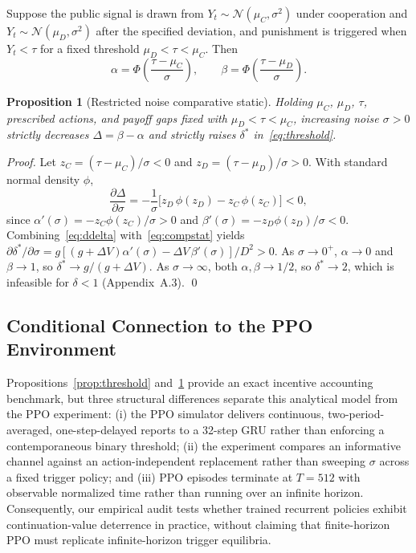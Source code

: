 \documentclass{article}
\newtheorem{proposition}{Proposition}
\begin{document}
Suppose the public signal is drawn from $Y_t\sim\mathcal{N}(\mu_C,\sigma^2)$ under cooperation and $Y_t\sim\mathcal{N}(\mu_D,\sigma^2)$ after the specified deviation, and punishment is triggered when $Y_t<\tau$ for a fixed threshold $\mu_D<\tau<\mu_C$. Then
\[
\alpha = \Phi\!\left(\frac{\tau-\mu_C}{\sigma}\right),\qquad
\beta  = \Phi\!\left(\frac{\tau-\mu_D}{\sigma}\right).
\]

\begin{proposition}[Restricted noise comparative static]\label{prop:gauss}
Holding $\mu_C$, $\mu_D$, $\tau$, prescribed actions, and payoff gaps fixed with $\mu_D<\tau<\mu_C$, increasing noise $\sigma>0$ strictly decreases $\Delta=\beta-\alpha$ and strictly raises $\delta^*$ in~\eqref{eq:threshold}.
\end{proposition}

\begin{proof}
Let $z_C=(\tau-\mu_C)/\sigma < 0$ and $z_D=(\tau-\mu_D)/\sigma > 0$. With standard normal density $\phi$,
\begin{equation}\label{eq:ddelta}
\frac{\partial\Delta}{\partial\sigma}
= -\frac{1}{\sigma}\bigl[z_D\,\phi(z_D)-z_C\,\phi(z_C)\bigr] < 0,
\end{equation}
since $\alpha'(\sigma)=-z_C\phi(z_C)/\sigma > 0$ and $\beta'(\sigma)=-z_D\phi(z_D)/\sigma < 0$. Combining~\eqref{eq:ddelta} with~\eqref{eq:compstat} yields $\partial\delta^*/\partial\sigma = g[(g+\Delta V)\alpha'(\sigma)-\Delta V\,\beta'(\sigma)]/D^2 > 0$. As $\sigma\to 0^+$, $\alpha\to 0$ and $\beta\to 1$, so $\delta^*\to g/(g+\Delta V)$. As $\sigma\to\infty$, both $\alpha,\beta\to 1/2$, so $\delta^*\to 2$, which is infeasible for $\delta<1$ (Appendix~A.3). \qed
\end{proof}

\subsection{Conditional Connection to the PPO Environment}

Propositions~\ref{prop:threshold} and~\ref{prop:gauss} provide an exact incentive accounting benchmark, but three structural differences separate this analytical model from the PPO experiment: (i) the PPO simulator delivers continuous, two-period-averaged, one-step-delayed reports to a 32-step GRU rather than enforcing a contemporaneous binary threshold; (ii) the experiment compares an informative channel against an action-independent replacement rather than sweeping $\sigma$ across a fixed trigger policy; and (iii) PPO episodes terminate at $T=512$ with observable normalized time rather than running over an infinite horizon. Consequently, our empirical audit tests whether trained recurrent policies exhibit continuation-value deterrence in practice, without claiming that finite-horizon PPO must replicate infinite-horizon trigger equilibria.
\end{document}
